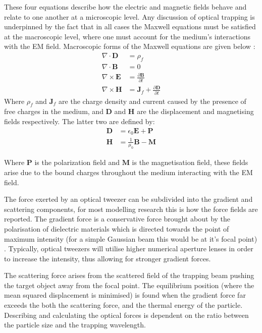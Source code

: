 These four equations describe how the electric and magnetic fields behave
and relate to one another at a microscopic level. Any discussion 
of optical trapping is underpinned by the fact that in all cases the 
Maxwell equations must be satisfied at the macroscopic level, where 
one must account for the medium's interactions with the EM field. 
Macroscopic forms of the Maxwell equations are given below \cite{Jackson_1975}:
\begin{align}
	\nabla \cdot \mathbf{D}
	&= \rho_f
	\\
	\nabla \cdot \mathbf{B}
	&= 0
	\\
	\nabla \times \mathbf{E}
	&= \frac{\partial \mathbf{B}}{\partial t}
	\\
	\nabla \times \mathbf{H}
	&= \mathbf{J}_f +\frac{\partial \mathbf{D}}{\partial t}  
\end{align}
Where $\rho_f$ and $\mathbf{J}_f$ are the charge density and current 
caused by the presence of free charges in the medium, and $\mathbf{D}$ 
and $\mathbf{H}$ are the displacement and magnetising fields respectively. 
The latter two are defined by:
\begin{align}
	\nonumber
	\mathbf{D} &= \epsilon_0\mathbf{E}+\mathbf{P} 
	\\ 
	\nonumber
	\mathbf{H} &= \frac{1}{\mu_0}\mathbf{B}-\mathbf{M}
\end{align}

Where $\mathbf{P}$ is the polarization field and $\mathbf{M}$ is the 
magnetisation field, these fields arise due to the bound charges 
throughout the medium interacting with the EM field. 
 
The force exerted by an optical tweezer can be subdivided into the 
gradient and scattering components, for most modelling research this 
is how the force fields are reported. The gradient force is a conservative 
force brought about by the polarisation of dielectric materials which 
is directed towards the point of maximum intensity (for a simple Gaussian 
beam this would be at it's focal point) \cite{YasuhiroHarada1996}. 
Typically, optical tweezers will utilise higher numerical aperture lenses 
in order to increase the intensity, thus allowing for stronger 
gradient forces.

The scattering force arises from the scattered field of the trapping beam 
pushing the target object away from the focal point. The equilibrium position 
(where the mean squared displacement is minimised) is found when the 
gradient force far exceeds the both the scattering force, and the thermal 
energy of the particle. Describing and calculating the optical forces is 
dependent on the ratio between the particle size and the trapping wavelength. 

